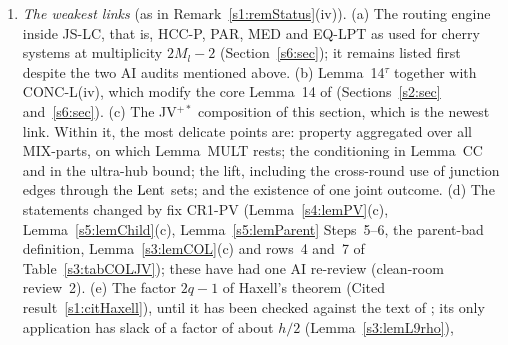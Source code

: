 \begin{enumerate}
every changed statement and returned verdict~(A), no fatal or major error; its
minor and cosmetic fixes are applied here and have not been re-reviewed, and
the proof of the stated form of Haxell's theorem (Cited
result~\ref{s1:citHaxell}), added after G0, has had no referee yet. In
Table~\ref{s1:tabDAG}, the
statements that were added for version~6, or whose statement or proof was
rewritten for it, are marked ``one clean-room AI review (G0, 2026-09-26)'';
changes that concern only
single proof steps, dependency entries, pointers, names, titles or explanatory
text are not necessarily marked. G0, like every earlier review, was done by AI
agents; no human expert has refereed any part of the text, and the text remains
a \candidate{} proof. Version~6.1 (26 September 2026) applies the manuscript
patches found by the triage of the formalization in Lean (P2 triage): $M_l$ is
an integer, the fixed rules of Construction~\ref{s7:consRound} have declared
arguments, and several wording and proof-step repairs; no constant changes and
no statement used downstream is weakened (Lemma~\ref{s6:lemJSLC} is restated in
the form its only consumer uses; Remark~\ref{s1:remStatus}(iii)). These patches have had
no referee yet; the changed statements are marked ``changed in v6.1 (P2
triage): no referee yet'' in Table~\ref{s1:tabDAG}.
\item \emph{The weakest links} (as in Remark~\ref{s1:remStatus}(iv)).
(a) The routing engine inside JS-LC, that is, HCC-P, PAR, MED and EQ-LPT as used
for cherry systems at multiplicity $2M_l-2$ (Section~\ref{s6:sec}); it remains
listed first despite the two AI audits mentioned above.
(b) Lemma~14$^\tau$ together with CONC-L(iv), which modify the core Lemma~14 of
\cite{BM} (Sections~\ref{s2:sec} and~\ref{s6:sec}).
(c) The JV$^{+*}$ composition of this section, which is the newest link. Within
it, the most delicate points are: property  aggregated over all MIX-parts,
on which Lemma~MULT rests; the conditioning in Lemma~CC and in the ultra-hub
bound; the lift, including the cross-round use of junction edges through the
$\mathrm{Lent}$ sets; and the existence of one joint outcome.
(d) The statements changed by fix \textsf{CR1-PV} (Lemma~\ref{s4:lemPV}(c),
Lemma~\ref{s5:lemChild}(c), Lemma~\ref{s5:lemParent} Steps~5--6, the
parent-bad definition, Lemma~\ref{s3:lemCOL}(c) and rows~4 and~7 of
Table~\ref{s3:tabCOLJV}); these have had one AI re-review (clean-room
review~2).
(e) The factor $2q-1$ of Haxell's theorem (Cited result~\ref{s1:citHaxell}),
until it has been checked against the text of \cite{Hax95}; its only
application has slack of a factor of about $h/2$ (Lemma~\ref{s3:lemL9rho}),

\end{enumerate}
